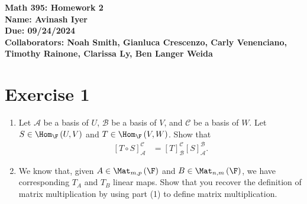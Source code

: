 \documentclass[10pt]{mypackage}
\begin{document}
\RaggedRight
\begin{center}
  \bfseries
  Math 395: Homework 2\\
  Name: Avinash Iyer\\
  Due: 09/24/2024\\
  Collaborators: Noah Smith, Gianluca Crescenzo, Carly Venenciano, Timothy Rainone, Clarissa Ly, Ben Langer Weida
\end{center}
\section{Exercise 1}%
\begin{problem}\hfill
  \begin{enumerate}[(1)]
    \item Let $\mathcal{A}$ be a basis of $U$, $\mathcal{B}$ be a basis of $V$, and $\mathcal{C}$ be a basis of $W$. Let $S\in \Hom_{\F}\left(U,V\right)$ and $T\in \Hom_{\F}\left(V,W\right)$. Show that
      \begin{align*}
        \left[T\circ S\right]_{\mathcal{A}}^{\mathcal{C}} &= \left[T\right]_{\mathcal{B}}^{\mathcal{C}}\left[S\right]_{\mathcal{A}}^{\mathcal{B}}.
      \end{align*}
    \item We know that, given $A\in \Mat_{m,p}\left(\F\right)$ and $B\in \Mat_{n,m}\left(\F\right)$, we have corresponding $T_A$ and $T_B$ linear maps. Show that you recover the definition of matrix multiplication by using part (1) to define matrix multiplication.
  \end{enumerate}
\end{problem}
\end{document}
